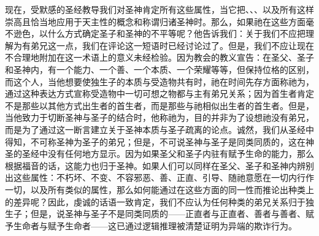 现在，受默感的圣经教导我们对圣神肯定所有这些属性，当它把、、、以及所有这样崇高且恰当地应用于天主性的概念和称谓归诸圣神时。那么，如果祂在这些方面毫不逊色，以什么方式确定圣子和圣神的不平等呢？他告诉我们：关于我们不应把理解为有弟兄这一点，我们在评论这一短语时已经讨论过了。但是，我们不应让现在不合理地附加在这一术语上的意义未经检验。因为教会的教义宣告：在圣父、圣子和圣神内，有一个能力、一个善、一个本质、一个荣耀等等，但保持位格的区别，而这个人，当他想要使独生子的本质与受造物共有时，祂在时间先存方面称祂为，通过这种表达方式宣称受造物中一切可想之物都与主有弟兄关系；因为首生者肯定不是那些以其他方式出生者的首生者，而是那些与祂相似出生者的首生者。但是，当他致力于切断圣神与圣子的结合时，他称祂为，目的并非为了设想祂没有弟兄，而是为了通过这一断言建立关于圣神本质与圣子疏离的论点。诚然，我们从圣经中得知，不可称圣神为圣子的弟兄；但是，不可说圣神与圣子是同类同质的，这在神圣的圣经中没有任何地方显示。因为如果圣父和圣子内驻有赋予生命的能力，那么根据福音的话，这能力也归于圣神。如果人们可以同样在圣父、圣子和圣神内辨别出这些属性：不朽坏、不变、不容邪恶、善、正直、引导、随祂意愿在一切内行作一切，以及所有类似的属性，那么如何能通过在这些方面的同一性而推论出种类上的差异呢？因此，虔诚的话语一致肯定，我们不应认为任何种类的弟兄关系归于独生子；但是，说圣神与圣子不是同类同质的——正直者与正直者、善者与善者、赋予生命者与赋予生命者——这已通过逻辑推理被清楚证明为异端的欺诈行为。\par

